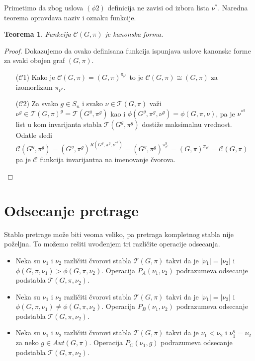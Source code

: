 \documentclass[12pt,oneside]{memoir}
\newtheorem{theorem}{Teorema}
\theoremstyle{definition}
\begin{document}
  Primetimo da zbog uslova $(\phi2)$ definicija ne zavisi od izbora lista
  $\nu^*$. Naredna teorema opravdava naziv i oznaku funkcije.

  \begin{theorem}
	  Funkcija $\mathcal{C}(G, \pi)$ je kanonska forma.
  \end{theorem}

  \begin{proof}
		Dokazujemo da ovako definisana funkcija ispunjava uslove kanonske forme za
		svaki obojen graf $(G, \pi)$.
	  \begin{itemize}
		  \item [($\mathcal{C}1$)] Kako je $\mathcal{C}(G, \pi) = (G,
			  \pi)^{\pi_{\nu^*}}$ to je $\mathcal{C}(G, \pi) \cong (G, \pi)$ za
			  izomorfizam $\pi_{\nu^*}$.
		  \item [($\mathcal{C}2$)] Za svako $g \in S_n$ i svako $\nu \in
			  \mathcal{T}(G, \pi)$ važi $\nu^g \in \mathcal{T}(G, \pi)^g =
			  \mathcal{T}(G^g, \pi^g)$ kao i $\phi(G^g, \pi^g, \nu^g) = \phi(G,
			  \pi, \nu)$, pa je $\nu^*^g$ list u kom invarijanta stabla
			  $\mathcal{T}(G^g, \pi^g)$ dostiže maksimalnu vrednost.  Odatle
			  sledi $\mathcal{C}(G^g, \pi^g) = (G^g, \pi^g)^{R(G^g, \pi^g,
			  \nu^*^g)} = (G^g, \pi^g)^{\pi_{v^*}^g} = (G, \pi)^{\pi_{v^*}} =
			  \mathcal{C}(G, \pi)$ pa je $\mathcal{C}$ funkcija invarijantna na
			  imenovanje čvorova.
	  \end{itemize}
  \end{proof}

 \section{Odsecanje pretrage}

  Stablo pretrage može biti veoma veliko, pa pretraga kompletnog stabla nije
  poželjna. To možemo rešiti uvođenjem tri različite operacije odsecanja.
  \begin{itemize}
	  \item Neka su $\nu_1$ i $\nu_2$ različiti čvorovi stabla $\mathcal{T}(G,
		  \pi)$ takvi da je $|\nu_1|=|\nu_2|$ i $\phi(G, \pi, \nu_1) >
		  \phi(G, \pi, \nu_2)$. Operacija $P_A(\nu_1, \nu_2)$ podrazumeva
		  odsecanje podstabla $\mathcal{T}(G, \pi, \nu_2)$.
	  \item Neka su $\nu_1$ i $\nu_2$ različiti čvorovi stabla $\mathcal{T}(G,
		  \pi)$ takvi da je $|\nu_1|=|\nu_2|$ i $\phi(G, \pi, \nu_1) \neq
		  \phi(G, \pi, \nu_2)$. Operacija $P_B(\nu_1, \nu_2)$ podrazumeva
		  odsecanje podstabla $\mathcal{T}(G, \pi, \nu_2)$.
	  \item Neka su $\nu_1$ i $\nu_2$ različiti čvorovi stabla $\mathcal{T}(G,
		  \pi)$ takvi da je $\nu_1 < \nu_2$ i $\nu_1^g=\nu_2$ za neko $g \in
		  Aut(G, \pi)$. Operacija $P_C(\nu_1, g)$ podrazumeva odsecanje
		  podstabla $\mathcal{T}(G, \pi, \nu_2)$.
  \end{itemize}
\end{document}

